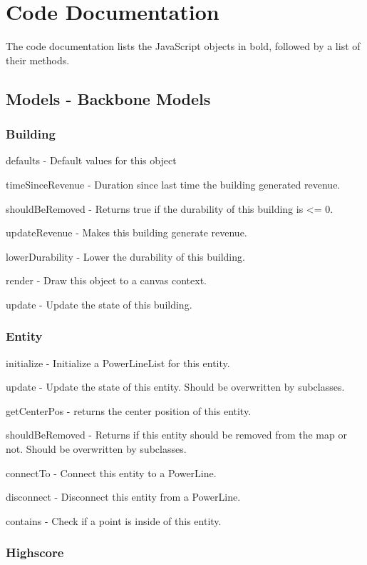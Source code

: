 \chapter{Code Documentation}

The code documentation lists the JavaScript objects in bold, followed by a list of their methods.

\clearpage 

\section{Models - Backbone Models}

\subsection*{Building}
	defaults - Default values for this object

	timeSinceRevenue - Duration since last time the building generated revenue.

	shouldBeRemoved - Returns true if the durability of this building is <= 0.

	updateRevenue - Makes this building generate revenue.

	lowerDurability - Lower the durability of this building.

	render - Draw this object to a canvas context.

	update - Update the state of this building.

\subsection*{Entity}

	initialize - Initialize a PowerLineList for this entity.

	update - Update the state of this entity. Should be overwritten by subclasses.

	getCenterPos - returns the center position of this entity.

	shouldBeRemoved - Returns if this entity should be removed from the map or not. Should be overwritten by subclasses.

	connectTo - Connect this entity to a PowerLine.

	disconnect - Disconnect this entity from a PowerLine.

	contains - Check if a point is inside of this entity.

\subsection*{Highscore}

